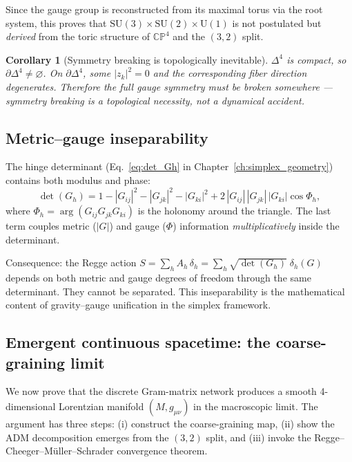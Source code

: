 \documentclass[12pt]{article}
\newtheorem{corollary}[theorem]{Corollary}
\theoremstyle{remark}
\theoremstyle{definition}
\begin{document}
Since the gauge group is reconstructed from its maximal torus via the root system, this proves that $\mathrm{SU}(3) \times \mathrm{SU}(2) \times \mathrm{U}(1)$ is not postulated but \emph{derived} from the toric structure of $\mathbb{CP}^4$ and the $(3,2)$ split.

\begin{corollary}[Symmetry breaking is topologically inevitable]
\label{cor:breaking}
$\Delta^4$ is compact, so $\partial\Delta^4 \neq \varnothing$.  On $\partial\Delta^4$, some $|z_k|^2 = 0$ and the corresponding fiber direction degenerates.  Therefore the full gauge symmetry \emph{must} be broken somewhere --- symmetry breaking is a topological necessity, not a dynamical accident.
\end{corollary}

\subsection{Metric--gauge inseparability}
\label{sec:inseparability}

The hinge determinant (Eq.~\ref{eq:det_Gh} in Chapter~\ref{ch:simplex_geometry}) contains both modulus and phase:
\begin{equation}
\det(G_h) = 1 - |G_{ij}|^2 - |G_{jk}|^2 - |G_{ki}|^2 + 2\,|G_{ij}|\,|G_{jk}|\,|G_{ki}|\cos\Phi_h,
\end{equation}
where $\Phi_h = \arg(G_{ij} G_{jk} G_{ki})$ is the holonomy around the triangle.  The last term couples metric ($|G|$) and gauge ($\Phi$) information \emph{multiplicatively} inside the determinant.

Consequence: the Regge action $S = \sum_h A_h\,\delta_h = \sum_h \sqrt{\det(G_h)}\;\delta_h(G)$ depends on both metric and gauge degrees of freedom through the same determinant.  They cannot be separated.  This inseparability is the mathematical content of gravity--gauge unification in the simplex framework.

\subsection{Emergent continuous spacetime: the coarse-graining limit}
\label{sec:emergent_spacetime}

We now prove that the discrete Gram-matrix network produces a smooth 4-dimensional Lorentzian manifold $(M, g_{\mu\nu})$ in the macroscopic limit.  The argument has three steps: (i) construct the coarse-graining map, (ii) show the ADM decomposition emerges from the $(3,2)$ split, and (iii) invoke the Regge--Cheeger--M\"uller--Schrader convergence theorem.
\end{document}
